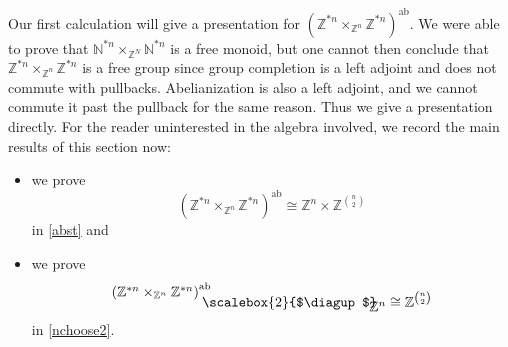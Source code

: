 \documentclass{amsbook} %
\newcommand{\bigquotient}[2]{ \raisebox{0.75\height}{$#1$} \mkern-12mu\scalebox{2}{$\diagup$}\mkern-10mu \raisebox{-0.5\height}{$#2$} }
\newcommand{\ab}{\mathrm{ab}}
\numberwithin{section}{chapter}
\begin{document}
 Our first calculation will give a presentation for $(\mathbb{Z}^{\ast n} \times_{\mathbb{Z}^n} \mathbb{Z}^{\ast n})^{\ab}$. We were able to prove that $\mathbb{N}^{\ast n} \times_{\mathbb{Z}^N} \mathbb{N}^{\ast n}$ is a free monoid, but one cannot then conclude that $\mathbb{Z}^{\ast n} \times_{\mathbb{Z}^n} \mathbb{Z}^{\ast n}$ is a free group since group completion is a left adjoint and does not commute with pullbacks. Abelianization is also a left adjoint, and we cannot commute it past the pullback for the same reason. Thus we give a presentation directly. For the reader uninterested in the algebra involved, we record the main results of this section now:
 \begin{itemize}
 \item we prove
  \[
    (\mathbb{Z}^{\ast n} \times_{\mathbb{Z}^n} \mathbb{Z}^{\ast n})^{\ab} \cong \mathbb{Z}^n \times {\mathbb{Z}}^{\binom{n}{2}}
  \]
 in \cref{abst} and
 \item we prove
  \[ 
    \bigquotient{{(\mathbb{Z}^{\ast n} \times_{\mathbb{Z}^n} \mathbb{Z}^{\ast n})}^{\ab}}{\mathbb{Z}^n} \cong \mathbb{Z}^{\binom{n}{2}} 
  \]
in \cref{nchoose2}.
 \end{itemize}
\end{document}

